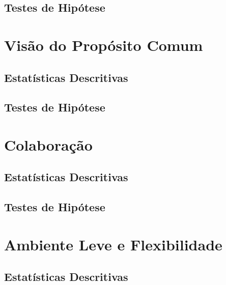 \documentclass[]{book}
\begin{document}
\hypertarget{testes-de-hipotese-8}{%
\subsection{Testes de Hipótese}\label{testes-de-hipotese-8}}

\hypertarget{visao-do-proposito-comum-1}{%
\section{Visão do Propósito Comum}\label{visao-do-proposito-comum-1}}

\hypertarget{estatisticas-descritivas-9}{%
\subsection{Estatísticas Descritivas}\label{estatisticas-descritivas-9}}

\hypertarget{testes-de-hipotese-9}{%
\subsection{Testes de Hipótese}\label{testes-de-hipotese-9}}

\hypertarget{colaboracao-1}{%
\section{Colaboração}\label{colaboracao-1}}

\hypertarget{estatisticas-descritivas-10}{%
\subsection{Estatísticas Descritivas}\label{estatisticas-descritivas-10}}

\hypertarget{testes-de-hipotese-10}{%
\subsection{Testes de Hipótese}\label{testes-de-hipotese-10}}

\hypertarget{ambiente-leve-e-flexibilidade-1}{%
\section{Ambiente Leve e Flexibilidade}\label{ambiente-leve-e-flexibilidade-1}}

\hypertarget{estatisticas-descritivas-11}{%
\subsection{Estatísticas Descritivas}\label{estatisticas-descritivas-11}}
\end{document}
